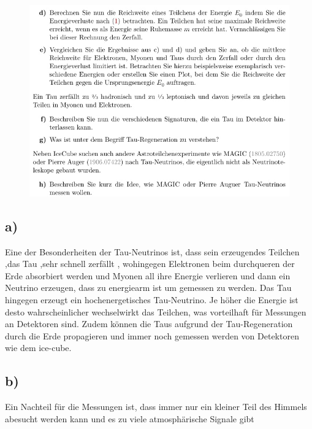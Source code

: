     \begin{figure}[H]
        \centering
        \includegraphics[width=\textwidth]{images/Aufgabe22b.jpg}
        \label{fig:2}
    \end{figure}

\subsection{a)}\justifying

    Eine der Besonderheiten der Tau-Neutrinos ist, dass sein erzeugendes Teilchen ,das Tau ,sehr schnell zerfällt
    , wohingegen Elektronen beim durchqueren der Erde absorbiert werden und Myonen all 
    ihre Energie verlieren und dann ein Neutrino erzeugen, dass zu energiearm ist um gemessen zu werden.
    Das Tau hingegen erzeugt ein hochenergetisches Tau-Neutrino. Je höher die Energie ist
    desto wahrscheinlicher wechselwirkt das Teilchen, was vorteilhaft für Messungen an
    Detektoren sind. Zudem können die Taus aufgrund der Tau-Regeneration durch die Erde propagieren
    und immer noch gemessen werden von Detektoren wie dem ice-cube.

\subsection{b)}
Ein Nachteil für die Messungen ist, dass immer nur ein kleiner Teil des Himmels
abesucht werden kann und es zu viele atmosphärische Signale gibt

